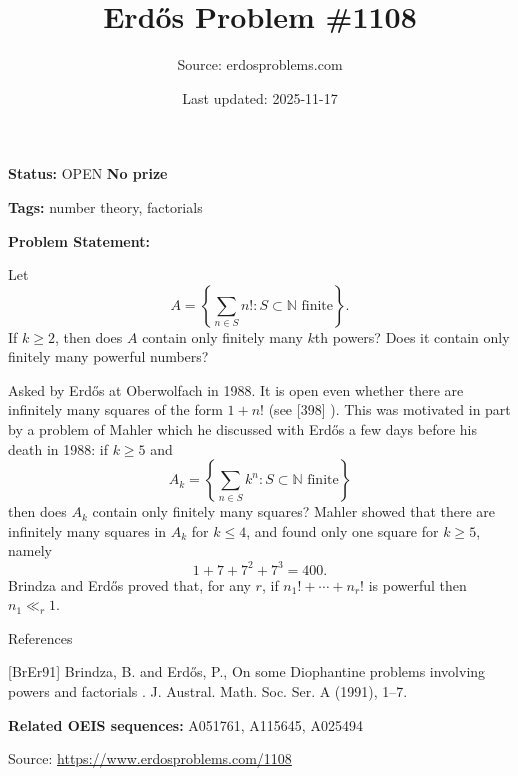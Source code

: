 \documentclass{article}
\title{Erd\H{o}s Problem \#1108}
\date{Last updated: 2025-11-17}
\author{Source: erdosproblems.com}
\begin{document}
\maketitle

\noindent\textbf{Status:} OPEN \quad \textbf{No prize}

\noindent\textbf{Tags:} number theory, factorials

\medskip

\noindent\textbf{Problem Statement:}

Let\[A = \left\{ \sum_{n\in S}n! : S\subset \mathbb{N}\textrm{ finite}\right\}.\]If $k\geq 2$, then does $A$ contain only finitely many $k$th powers? Does it contain only finitely many powerful numbers?




Asked by Erd\H{o}s at Oberwolfach in 1988. It is open even whether there are infinitely many squares of the form $1+n!$ (see [398] ). This was motivated in part by a problem of Mahler which he discussed with Erd\H{o}s a few days before his death in 1988: if $k\geq 5$ and\[A_k= \left\{ \sum_{n\in S}k^n : S\subset \mathbb{N}\textrm{ finite}\right\}\]then does $A_k$ contain only finitely many squares? Mahler showed that there are infinitely many squares in $A_k$ for $k\leq 4$, and found only one square for $k\geq 5$, namely\[1+7+7^2+7^3=400.\]Brindza and Erd\H{o}s \cite{BrEr91} proved that, for any $r$, if $n_1!+\cdots+n_r!$ is powerful then $n_1\ll_r 1$.




References

[BrEr91] Brindza, B. and Erd\H{o}s, P., On some {D}iophantine problems involving powers and factorials . J. Austral. Math. Soc. Ser. A (1991), 1--7.

\noindent\textbf{Related OEIS sequences:} A051761, A115645, A025494


\bigskip
\noindent\small{Source: \url{https://www.erdosproblems.com/1108}}
\end{document}

